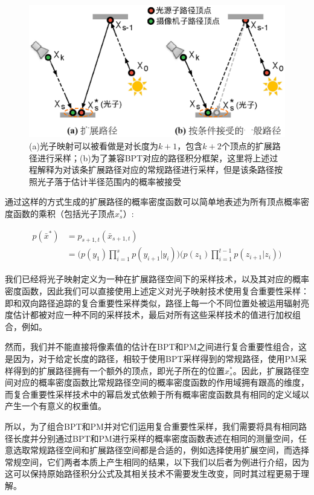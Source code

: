 \begin{figure}
\sidecaption
	\includegraphics[width=.65\textwidth]{figures/pm/vcm}
	\caption{(a)光子映射可以被看做是对长度为$k+1$，包含$k+2$个顶点的扩展路径进行采样；(b)为了兼容BPT对应的路径积分框架，这里将上述过程解释为对该条扩展路径对应的常规路径进行采样，但是该条路径按照光子落于估计半径范围内的概率被接受}
	\label{f:pm-vcm}
\end{figure}

通过这样的方式生成的扩展路径的概率密度函数可以简单地表述为所有顶点概率密度函数的乘积（包括光子顶点$x^{*}_s$）:

\begin{equation}\label{e:pm-extended-path-pdf}
\begin{aligned}
	p(\bar{x}^{*})&=p_{s+1,t}(\bar{x}_{s+1,t})\\
	&=\Biggl(p(y_1)\prod^{s}_{i=1}p(y_{i+1}|y_i)\Biggl)\Biggl(p(z_1)\prod^{t-1}_{i=1}p(z_{i+1}|z_i)\Biggl)
\end{aligned}
\end{equation}

我们已经将光子映射定义为一种在扩展路径空间下的采样技术，以及其对应的概率密度函数，因此我们可以直接使用上述定义对光子映射技术使用复合重要性采样：即和双向路径追踪的复合重要性采样类似，路径上每一个不同位置处被运用辐射亮度估计都被对应一种不同的采样技术，最后对所有这些采样技术的值进行加权组合，例如\cite{a:BidirectionalPhotonMapping}。

然而，我们并不能直接将像素值的估计在BPT和PM之间进行复合重要性组合，这是因为，对于给定长度的路径，相较于使用BPT采样得到的常规路径，使用PM采样得到的扩展路径拥有一个额外的顶点，即光子所在的位置$x^{*}_s$。因此，扩展路径空间对应的概率密度函数比常规路径空间的概率密度函数的作用域拥有跟高的维度，而复合重要性采样技术中的幂启发式依赖于所有概率密度函数具有相同的定义域以产生一个有意义的权重值。

所以，为了组合BPT和PM并对它们运用复合重要性采样，我们需要将具有相同路径长度并分别通过BPT和PM进行采样的概率密度函数表述在相同的测量空间，任意选取常规路径空间和扩展路径空间都是合适的，例如\cite{a:APathSpaceExtensionforRobustLightTransportSimulation}选择使用扩展空间，而\cite{a:LightTransportSimulationwithVertexConnectionandMerging}选择常规空间，它们两者本质上产生相同的结果，以下我们以后者为例进行介绍，因为这可以保持原始路径积分公式及其相关技术不需要发生改变，同时其过程更易于理解。






